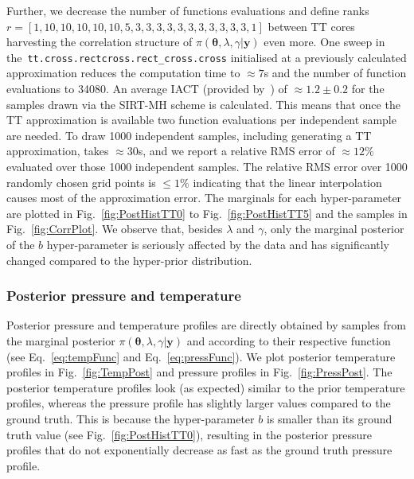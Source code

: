 Further, we decrease the number of functions evaluations and define ranks \linebreak$r =[ 1,  10,  10, 10, 10, 10, 5, 3, 3, 3, 3, 3, 3 , 3, 3, 3, 3, 3, 1]$ between TT cores harvesting the correlation structure of $\pi(\bm{\theta},\lambda,\gamma  | \bm{y})$ even more.
One sweep in \linebreak the~\texttt{tt.cross.rectcross.rect\_cross.cross} initialised at a previously calculated approximation reduces the computation time to $\approx 7$s and the number of function evaluations to 34080.
An average IACT (provided by~\cite{wolff2004monte, drikHesse}) of $\approx 1.2 \pm 0.2$ for the samples drawn via the SIRT-MH scheme is calculated.
This means that once the TT approximation is available two function evaluations per independent sample are needed.
To draw 1000 independent samples, including generating a TT approximation, takes $\approx30$s, and we report a relative RMS error of $\approx 12 \%$ evaluated over those 1000 independent samples.
The relative RMS error over 1000 randomly chosen grid points is $\leq 1\%$ indicating that the linear interpolation causes most of the approximation error.
The marginals for each hyper-parameter are plotted in Fig.~\ref{fig:PostHistTT0} to Fig.~\ref{fig:PostHistTT5} and the samples in Fig.~\ref{fig:CorrPlot}.
We observe that, besides $\lambda$ and $\gamma$, only the marginal posterior of the $b$ hyper-parameter is seriously affected by the data and has significantly changed compared to the hyper-prior distribution.
\clearpage
\subsubsection{Posterior pressure and temperature}
Posterior pressure and temperature profiles are directly obtained by samples from the marginal posterior $\pi(\bm{\theta},\lambda,\gamma  | \bm{y})$ and according to their respective function (see Eq.~\ref{eq:tempFunc} and Eq.~\ref{eq:pressFunc}). 
We plot posterior temperature profiles in Fig.~\ref{fig:TempPost} and pressure profiles in Fig.~\ref{fig:PressPost}.
The posterior temperature profiles look (as expected) similar to the prior temperature profiles, whereas the pressure profile has slightly larger values compared to the ground truth.
This is because the hyper-parameter $b$ is smaller than its ground truth value (see Fig.~\ref{fig:PostHistTT0}), resulting in the posterior pressure profiles that do not exponentially decrease as fast as the ground truth pressure profile.

